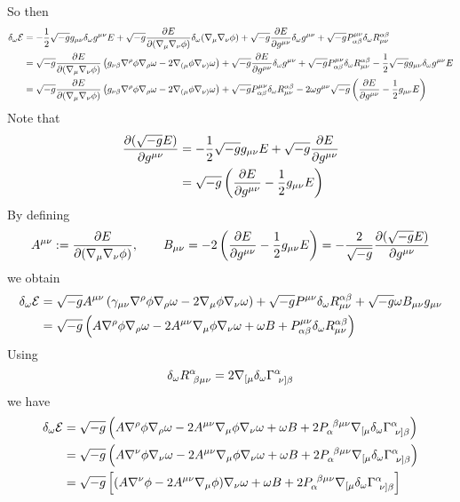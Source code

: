 So then
\begin{align*}
  \delta_\omega \mathcal{E}&=-\frac{1}{2}\sqrt{-g}g_{\mu\nu }\delta_\omega g^{\mu\nu }E+\sqrt{-g}\pdv{E}{(\nabla_\mu\nabla_\nu\phi)}\delta_\omega (\nabla_\mu \nabla_\nu \phi )+\sqrt{-g}\pdv{E}{g^{\mu\nu}}\delta_\omega g^{\mu\nu }+\sqrt{-g}P^{\mu\nu }_{\alpha\beta }\delta_\omega R^{\alpha\beta }_{\mu\nu }\\
  &=\sqrt{-g}\pdv{E}{(\nabla_\mu\nabla_\nu\phi)}\left(g_{\nu\beta }\nabla^\rho \phi\nabla_\rho\omega-2\nabla_{(\mu }\phi\nabla_{\nu)}\omega\right)+\sqrt{-g}\pdv{E}{g^{\mu\nu}}\delta_\omega g^{\mu\nu }+\sqrt{-g}P^{\mu\nu }_{\alpha\beta }\delta_\omega R^{\alpha\beta }_{\mu\nu }-\frac{1}{2}\sqrt{-g}g_{\mu\nu }\delta_\omega g^{\mu\nu }E\\
  &=\sqrt{-g}\pdv{E}{(\nabla_\mu\nabla_\nu\phi)}\left(g_{\nu\beta }\nabla^\rho \phi\nabla_\rho\omega-2\nabla_{(\mu }\phi\nabla_{\nu)}\omega\right)+\sqrt{-g}P^{\mu\nu }_{\alpha\beta }\delta_\omega R^{\alpha\beta }_{\mu\nu }-2\omega g^{\mu\nu}\sqrt{-g}\left(\pdv{E}{g^{\mu\nu}}-\frac{1}{2}g_{\mu\nu }E\right)
\end{align*}
Note that
\begin{align}
  \pdv{(\sqrt{-g}E)}{g^{\mu\nu}}&=-\frac{1}{2}\sqrt{-g}g_{\mu\nu }E+\sqrt{-g}\pdv{E}{g^{\mu\nu}}\\
  &=\sqrt{-g}\left(\pdv{E}{g^{\mu\nu}}-\frac{1}{2}g_{\mu\nu }E\right)
\end{align}
By defining
\begin{align}\label{A-B}
  A^{\mu\nu }:=\pdv{E}{(\nabla_\mu\nabla_\nu\phi)},\qquad B_{\mu\nu }=-2\left(\pdv{E}{g^{\mu\nu}}-\frac{1}{2}g_{\mu\nu }E\right)=-\frac{2}{\sqrt{-g}}\pdv{(\sqrt{-g}E)}{g^{\mu\nu}}
\end{align}
we obtain
\begin{align}
  \delta_\omega \mathcal{E}&=\sqrt{-g}A^{\mu\nu }\left(\gamma_{\mu\nu }\nabla^\rho \phi \nabla_\rho \omega-2\nabla_\mu \phi\nabla_\nu \omega\right)+\sqrt{-g}P^{\mu\nu }\delta_\omega R^{\alpha\beta }_{\mu\nu }+\sqrt{-g}\omega B_{\mu\nu }g_{\mu\nu }\\
  &=\sqrt{-g}\left(A\nabla^\rho \phi\nabla_\rho \omega-2A^{\mu\nu}\nabla_\mu \phi\nabla_\nu\omega+\omega B+P^{\mu\nu}_{\alpha\beta}\delta_\omega R^{\alpha\beta }_{\mu\nu }\right)
\end{align}
Using
\begin{equation}
  \delta_\omega R^\alpha _{~\beta\mu\nu }=2\nabla_{[\mu }\delta_\omega \Gamma^\alpha _{~\nu]\beta }
\end{equation}
we have
\begin{align}
    \delta_\omega \mathcal{E}&=\sqrt{-g}\left(A\nabla^\rho \phi\nabla_\rho \omega-2A^{\mu\nu}\nabla_\mu \phi\nabla_\nu\omega+\omega B+2P_\alpha ^{~\beta\mu\nu }\nabla_{[\mu }\delta_\omega \Gamma^{\alpha }_{~\nu]\beta }\right)\\
    &=\sqrt{-g}\left(A\nabla^\nu \phi\nabla_\nu  \omega-2A^{\mu\nu}\nabla_\mu \phi\nabla_\nu\omega+\omega B+2P_\alpha ^{~\beta\mu\nu }\nabla_{[\mu }\delta_\omega \Gamma^{\alpha }_{~\nu]\beta }\right)\\
    &=\sqrt{-g}\left[(A\nabla^\nu \phi -2A^{\mu\nu }\nabla_\mu\phi )\nabla_\nu \omega+\omega B+2P_\alpha ^{~\beta\mu\nu }\nabla_{[\mu }\delta_\omega \Gamma^{\alpha }_{~\nu]\beta }\right]
\end{align}

